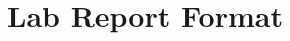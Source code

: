 \documentclass[]{msulabm}
\begin{document}
%
%
%
%
%
%
%
%
%
%
%
%
%

%
%
%
%
%
%
%
%
%
%
%
%
%
%
%
%
%
%
%
%
%
%
%
%
%
% 
% 
% 
% 
% 
% 
% 
% 
% 
% 

% 
% 
% 

\appendix


\chapter{Lab Report Format}



% 
% 
% 
% 
%
%
%
%
%
%
%
% 

% 
% 
\printbibliography
\end{document}
